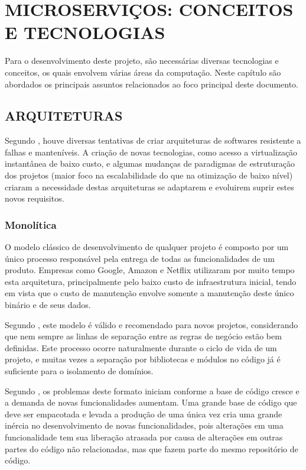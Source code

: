 \chapter{MICROSERVIÇOS: CONCEITOS E TECNOLOGIAS}
\label{chp:tecnologias}

Para o desenvolvimento deste projeto, são necessárias diversas tecnologias e
conceitos, os quais envolvem várias áreas da computação. Neste capítulo são
abordados os principais assuntos relacionados ao foco principal deste documento.

\section{ARQUITETURAS}

Segundo , houve diversas tentativas de criar
arquiteturas de softwares resistente a falhas e manteníveis. A criação de
novas tecnologias, como acesso a virtualização instantânea de baixo custo,
e algumas mudanças de paradigmas de estruturação dos projetos (maior foco
na escalabilidade do que na otimização de baixo nível) criaram a
necessidade destas arquiteturas se adaptarem e evoluirem suprir estes
novos requisitos.

\subsection{Monolítica}

O modelo clássico de desenvolvimento de qualquer projeto é composto por um
único processo responsável pela entrega de todas as funcionalidades de um
produto. Empresas como Google, Amazon e Netflix utilizaram por muito tempo
esta arquitetura, principalmente pelo baixo custo de infraestrutura inicial,
tendo em vista que o custo de manutenção envolve somente a manutenção deste
único binário e de seus dados.

Segundo , este modelo é válido e recomendado para novos
projetos, considerando que nem sempre as linhas de separação entre as regras
de negócio estão bem definidas. Este processo ocorre naturalmente durante o
ciclo de vida de um projeto, e muitas vezes a separação por bibliotecas e
módulos no código já é suficiente para o isolamento de domínios.

Segundo , os problemas deste formato iniciam conforme
a base de código cresce e a demanda de novas funcionalidades aumentam. Uma
grande base de código que deve ser empacotada e levada a produção de uma
única vez cria uma grande inércia no desenvolvimento de novas
funcionalidades, pois alterações em uma funcionalidade tem sua liberação
atrasada por causa de alterações em outras partes do código não
relacionadas, mas que fazem parte do mesmo repositório de código.

